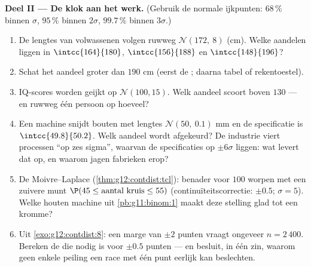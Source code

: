 \begin{problem}
\medskip
\noindent\textbf{Deel II --- De klok aan het werk.}
(Gebruik de normale ijkpunten: $68\,\%$ binnen $\sigma$, $95\,\%$ binnen
$2\sigma$, $99.7\,\%$ binnen $3\sigma$.)
\begin{enumerate}[resume]
  \item De lengtes van volwassenen volgen ruwweg $\mathcal N(172,\ 8)$ (cm).
        Welke aandelen liggen in $\intcc{164}{180}$, $\intcc{156}{188}$ en
        $\intcc{148}{196}$?
  \item Schat het aandeel groter dan $190$ cm (eerst de ; daarna tabel
        of rekentoestel).
  \item IQ-scores worden geijkt op $\mathcal N(100, 15)$. Welk aandeel scoort
        boven $130$ --- en ruwweg één persoon op hoeveel?
  \item Een machine snijdt bouten met lengtes $\mathcal N(50,\ 0.1)$ mm en de
        specificatie is $\intcc{49.8}{50.2}$. Welk aandeel wordt afgekeurd? De
        industrie viert processen ``op zes sigma'', waarvan de specificaties
        op $\pm 6\sigma$ liggen: wat levert dat op, en waarom jagen fabrieken
        erop?
  \item De Moivre--Laplace (\cref{thm:g12:contdist:tcl}): benader voor $100$
        worpen met een zuivere munt $\P(45 \leq \text{aantal kruis} \leq 55)$
        (continuïteitscorrectie: $\pm 0.5$; $\sigma = 5$). Welke houten
        machine uit \cref{pb:g11:binom:1} maakt deze stelling glad tot een
        kromme?
  \item Uit \cref{exo:g12:contdist:8}: een marge van $\pm 2$ punten vraagt
        ongeveer $n = 2\,400$. Bereken de  die nodig is voor
        $\pm 0.5$ punten --- en besluit, in één zin, waarom geen enkele
        peiling een race met één punt  eerlijk kan beslechten.
\end{enumerate}


\end{problem}
